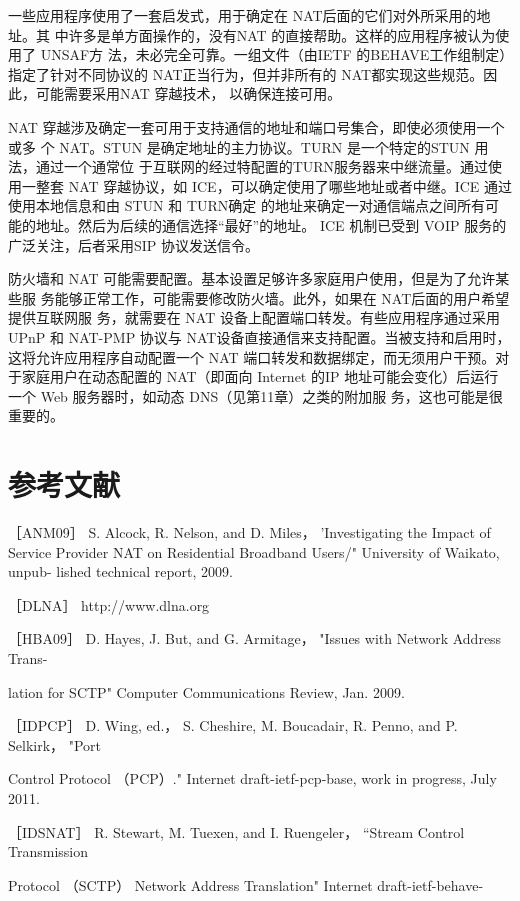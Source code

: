 一些应用程序使用了一套启发式，用于确定在 NAT后面的它们对外所采用的地址。其
中许多是单方面操作的，没有NAT 的直接帮助。这样的应用程序被认为使用了 UNSAF方
法，未必完全可靠。一组文件（由IETF 的BEHAVE工作组制定）指定了针对不同协议的
NAT正当行为，但并非所有的 NAT都实现这些规范。因此，可能需要采用NAT 穿越技术，
以确保连接可用。

NAT 穿越涉及确定一套可用于支持通信的地址和端口号集合，即使必须使用一个或多
个 NAT。STUN 是确定地址的主力协议。TURN 是一个特定的STUN 用法，通过一个通常位
于互联网的经过特配置的TURN服务器来中继流量。通过使用一整套 NAT 穿越协议，如
ICE，可以确定使用了哪些地址或者中继。ICE 通过使用本地信息和由 STUN 和 TURN确定
的地址来确定一对通信端点之间所有可能的地址。然后为后续的通信选择“最好”的地址。
ICE 机制已受到 VOIP 服务的广泛关注，后者采用SIP 协议发送信令。

防火墙和 NAT 可能需要配置。基本设置足够许多家庭用户使用，但是为了允许某些服
务能够正常工作，可能需要修改防火墙。此外，如果在 NAT后面的用户希望提供互联网服
务，就需要在 NAT 设备上配置端口转发。有些应用程序通过采用 UPnP 和 NAT-PMP 协议与
NAT设备直接通信来支持配置。当被支持和启用时，这将允许应用程序自动配置一个 NAT
端口转发和数据绑定，而无须用户干预。对于家庭用户在动态配置的 NAT（即面向 Internet
的IP 地址可能会变化）后运行一个 Web 服务器时，如动态 DNS（见第11章）之类的附加服
务，这也可能是很重要的。

\section{参考文献}

［ANM09］ S. Alcock, R. Nelson, and D. Miles， 'Investigating the Impact of Service
Provider NAT on Residential Broadband Users/" University of Waikato, unpub-
lished technical report, 2009.

［DLNA］ http://www.dlna.org

［HBA09］ D. Hayes, J. But, and G. Armitage， "Issues with Network Address Trans-

lation for SCTP" Computer Communications Review, Jan. 2009.

［IDPCP］ D. Wing, ed.， S. Cheshire, M. Boucadair, R. Penno, and P. Selkirk， "Port

Control Protocol （PCP）." Internet draft-ietf-pcp-base, work in progress, July 2011.

［IDSNAT］ R. Stewart, M. Tuexen, and I. Ruengeler， “Stream Control Transmission

Protocol （SCTP） Network Address Translation" Internet draft-ietf-behave-

